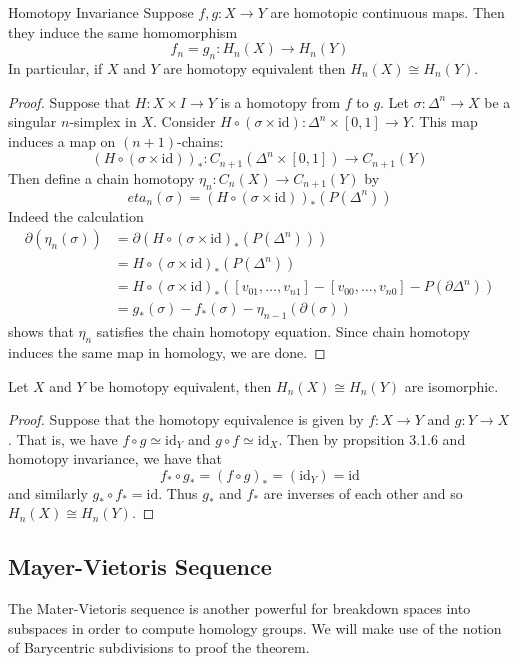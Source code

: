 \documentclass[a4paper]{article}
\begin{document}
\begin{thm}{Homotopy Invariance}{} Suppose $f,g:X\to Y$ are homotopic continuous maps. Then they induce the same homomorphism $$f_n=g_n:H_n(X)\to H_n(Y)$$ In particular, if $X$ and $Y$ are homotopy equivalent then $H_n(X)\cong H_n(Y)$. \tcbline
\begin{proof}
Suppose that $H:X\times I\to Y$ is a homotopy from $f$ to $g$. Let $\sigma:\Delta^n\to X$ be a singular $n$-simplex in $X$. Consider $H\circ(\sigma\times\text{id}):\Delta^n\times[0,1]\to Y$. This map induces a map on $(n+1)$-chains: $$(H\circ(\sigma\times\text{id}))_\ast:C_{n+1}(\Delta^n\times[0,1])\to C_{n+1}(Y)$$ Then define a chain homotopy $\eta_n:C_n(X)\to C_{n+1}(Y)$ by $$eta_n(\sigma)=(H\circ(\sigma\times\text{id}))_\ast(P(\Delta^n))$$ Indeed the calculation
\begin{align*}
\partial(\eta_n(\sigma))&=\partial(H\circ(\sigma\times\text{id})_\ast(P(\Delta^n)))\tag{Definition of $\eta_n$}\\
&=H\circ(\sigma\times\text{id})_\ast(P(\Delta^n))\tag{Chain map}\\
&=H\circ(\sigma\times\text{id})_\ast([v_{01},\dots,v_{n1}]-[v_{00},\dots,v_{n0}]-P(\partial\Delta^n))\tag{By the above lemma}\\
&=g_\ast(\sigma)-f_\ast(\sigma)-\eta_{n-1}(\partial(\sigma))
\end{align*}
shows that $\eta_n$ satisfies the chain homotopy equation. Since chain homotopy induces the same map in homology, we are done. 
\end{proof}
\end{thm}

\begin{crl}{}{} Let $X$ and $Y$ be homotopy equivalent, then $H_n(X)\cong H_n(Y)$ are isomorphic. \tcbline
\begin{proof}
Suppose that the homotopy equivalence is given by $f:X\to Y$ and $g:Y\to X$. That is, we have $f\circ g\simeq\text{id}_Y$ and $g\circ f\simeq\text{id}_X$. Then by propsition 3.1.6 and homotopy invariance, we have that $$f_\ast\circ g_\ast=(f\circ g)_\ast=(\text{id}_Y)=\text{id}$$ and similarly $g_\ast\circ f_\ast=\text{id}$. Thus $g_\ast$ and $f_\ast$ are inverses of each other and so $H_n(X)\cong H_n(Y)$. 
\end{proof}
\end{crl}

\subsection{Mayer-Vietoris Sequence}
The Mater-Vietoris sequence is another powerful for breakdown spaces into subspaces in order to compute homology groups. We will make use of the notion of Barycentric subdivisions to proof the theorem. 
\end{document}
